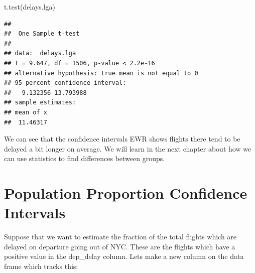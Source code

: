 \documentclass[
]{book}
\newenvironment{Shaded}{\begin{snugshade}}{\end{snugshade}}
\newcommand{\DecValTok}[1]{\textcolor[rgb]{0.00,0.00,0.81}{#1}}
\newcommand{\DocumentationTok}[1]{\textcolor[rgb]{0.56,0.35,0.01}{\textbf{\textit{#1}}}}
\newcommand{\FunctionTok}[1]{\textcolor[rgb]{0.00,0.00,0.00}{#1}}
\newcommand{\NormalTok}[1]{#1}
\newcommand{\OtherTok}[1]{\textcolor[rgb]{0.56,0.35,0.01}{#1}}
\newcommand{\SpecialCharTok}[1]{\textcolor[rgb]{0.00,0.00,0.00}{#1}}
\newcommand{\StringTok}[1]{\textcolor[rgb]{0.31,0.60,0.02}{#1}}
\theoremstyle{definition}
\theoremstyle{definition}
\theoremstyle{definition}
\theoremstyle{definition}
\theoremstyle{remark}
\begin{document}
\begin{Shaded}
\begin{Highlighting}[]
\FunctionTok{t.test}\NormalTok{(delays.lga)}
\end{Highlighting}
\end{Shaded}

\begin{verbatim}
## 
##  One Sample t-test
## 
## data:  delays.lga
## t = 9.647, df = 1506, p-value < 2.2e-16
## alternative hypothesis: true mean is not equal to 0
## 95 percent confidence interval:
##   9.132356 13.793988
## sample estimates:
## mean of x 
##  11.46317
\end{verbatim}

We can see that the confidence intervals EWR shows flights there tend to be delayed a bit longer on average. We will learn in the next chapter about how we can use statistics to find differences between groups.

\hypertarget{population-proportion-confidence-intervals}{%
\section{Population Proportion Confidence Intervals}\label{population-proportion-confidence-intervals}}

Suppose that we want to estimate the fraction of the total flights which are delayed on departure going out of NYC. These are the flights which have a positive value in the dep\_delay column. Lets make a new column on the data frame which tracks this:

\begin{Shaded}
\end{Shaded}

\begin{Shaded}
\end{Shaded}
\end{document}
